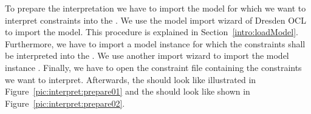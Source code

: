 To prepare the interpretation we have to import the model 
 for which we want to interpret constraints into the
. We use the model import wizard of Dresden OCL to import
the model. This procedure is explained in Section~\ref{intro:loadModel}. 
Furthermore, we have to import a model instance for which the constraints shall 
be interpreted into the . We use another import 
wizard to import the model instance 
.
Finally, we have to open the constraint file 
containing the constraints we want to interpret. Afterwards, the  should look like illustrated in Figure~\ref{pic:interpret:prepare01} 
and the  should look like shown in 
Figure~\ref{pic:interpret:prepare02}.

